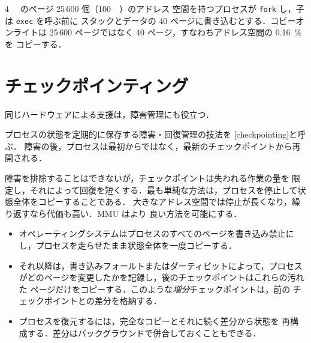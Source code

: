 \documentclass[../main.tex]{subfiles}
\begin{document}
\begin{example}
  \SI{4}{\kibi\byte} のページ 25\,600 個（\SI{100}{\mebi\byte}）のアドレス
  空間を持つプロセスが \texttt{fork} し，子は \texttt{exec} を呼ぶ前に
  スタックとデータの 40 ページに書き込むとする．コピーオンライトは 25\,600
  ページではなく 40 ページ，すなわちアドレス空間の \SI{0.16}{\percent} を
  コピーする．
\end{example}

\section{チェックポインティング}
\label{sec:l08-checkpointing}

同じハードウェアによる支援は，障害管理にも役立つ．

\begin{definition}[チェックポインティング]
  プロセスの状態を定期的に保存する障害・回復管理の技法を
  [checkpointing]と呼ぶ．
  障害の後，プロセスは最初からではなく，最新のチェックポイントから再開される．
\end{definition}

障害を排除することはできないが，チェックポイントは失われる作業の量を
限定し，それによって回復を短くする．最も単純な方法は，プロセスを停止して状態全体をコピーすることである．
大きなアドレス空間では停止が長くなり，繰り返すなら代価も高い．MMU はより
良い方法を可能にする．
\begin{itemize}
  \item オペレーティングシステムはプロセスのすべてのページを書き込み禁止に
    し，プロセスを走らせたまま状態全体を一度コピーする．
  \item それ以降は，書き込みフォールトまたはダーティビットによって，プロセス
    がどのページを変更したかを記録し，後のチェックポイントはこれらの汚れた
    ページだけをコピーする．このような\emph{増分}チェックポイントは，前の
    チェックポイントとの差分を格納する．
  \item プロセスを復元するには，完全なコピーとそれに続く差分から状態を
    再構成する．差分はバックグラウンドで併合しておくこともできる．
\end{itemize}
\end{document}
